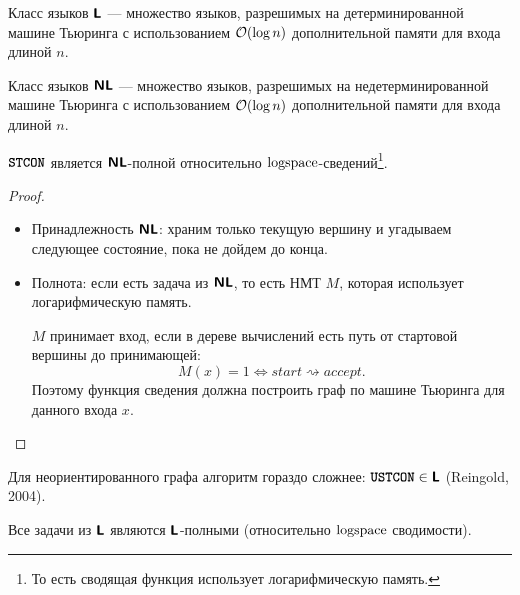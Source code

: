 \begin{defn}[$ \L$ и $ \NL$]
	\index{\L}
	Класс языков $ \L$ --- множество языков, разрешимых на детерминированной машине Тьюринга с использованием $\mathcal{O}(\log n)$ дополнительной памяти для входа длиной $ n$. 
   
    \noindent
    \index{\NL}
    Класс языков $\NL$ --- множество языков, разрешимых на недетерминированной машине Тьюринга с использованием $\mathcal{O}(\log n)$ дополнительной памяти для входа длиной $n$.
\end{defn}
\begin{lm}
$ {\textbf{\texttt{STCON}}}$ является $ \NL$-полной относительно $\textmd{logspace}$-сведений\footnote{То есть сводящая функция использует логарифмическую память.}.
\end{lm}
\begin{proof}
	\begin{itemize}
		\item Принадлежность $ \NL$: храним только текущую вершину и угадываем следующее состояние, пока не дойдем до конца.
		\item Полнота: если есть задача из $ \NL$, то есть НМТ $ M$, которая использует логарифмическую память. 
		
		$M$ принимает вход, если в дереве вычислений есть путь от стартовой вершины до принимающей:
			\[
				M(x) = 1 \Longleftrightarrow start \rightsquigarrow accept
			.\] 
			Поэтому функция сведения должна построить граф по машине Тьюринга для данного входа $ x$.
    \end{itemize}
\end{proof}
\begin{st}
	Для неориентированного графа алгоритм гораздо сложнее: $ {\textbf{\texttt{USTCON}}} \in \textmd{\textbf{\textsf{L}}}$ (Reingold, 2004).
\end{st}
\begin{st}
	Все задачи из $ \L$ являются  $ \L$-полными (относительно $\textmd{logspace}$ сводимости).
\end{st}

